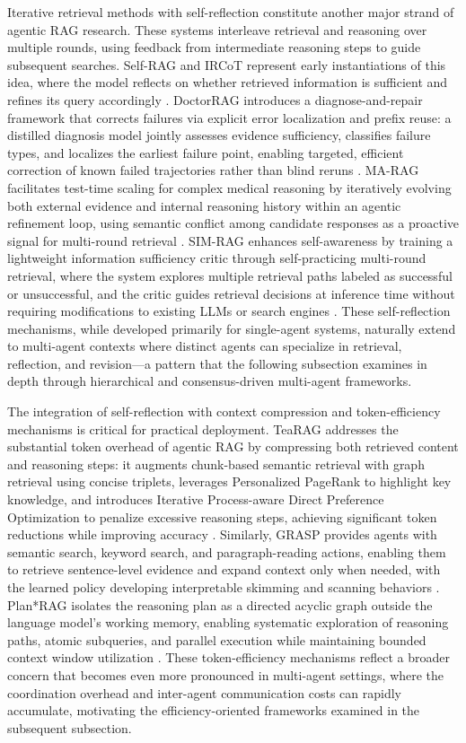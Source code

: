 \documentclass[11pt]{article}
\begin{document}
Iterative retrieval methods with self-reflection constitute another major strand of agentic RAG research. These systems interleave retrieval and reasoning over multiple rounds, using feedback from intermediate reasoning steps to guide subsequent searches. Self-RAG and IRCoT represent early instantiations of this idea, where the model reflects on whether retrieved information is sufficient and refines its query accordingly \cite{ref170}. DoctorRAG introduces a diagnose-and-repair framework that corrects failures via explicit error localization and prefix reuse: a distilled diagnosis model jointly assesses evidence sufficiency, classifies failure types, and localizes the earliest failure point, enabling targeted, efficient correction of known failed trajectories rather than blind reruns \cite{ref309}. MA-RAG facilitates test-time scaling for complex medical reasoning by iteratively evolving both external evidence and internal reasoning history within an agentic refinement loop, using semantic conflict among candidate responses as a proactive signal for multi-round retrieval \cite{ref310}. SIM-RAG enhances self-awareness by training a lightweight information sufficiency critic through self-practicing multi-round retrieval, where the system explores multiple retrieval paths labeled as successful or unsuccessful, and the critic guides retrieval decisions at inference time without requiring modifications to existing LLMs or search engines \cite{ref282}. These self-reflection mechanisms, while developed primarily for single-agent systems, naturally extend to multi-agent contexts where distinct agents can specialize in retrieval, reflection, and revision---a pattern that the following subsection examines in depth through hierarchical and consensus-driven multi-agent frameworks.

The integration of self-reflection with context compression and token-efficiency mechanisms is critical for practical deployment. TeaRAG addresses the substantial token overhead of agentic RAG by compressing both retrieved content and reasoning steps: it augments chunk-based semantic retrieval with graph retrieval using concise triplets, leverages Personalized PageRank to highlight key knowledge, and introduces Iterative Process-aware Direct Preference Optimization to penalize excessive reasoning steps, achieving significant token reductions while improving accuracy \cite{ref311}. Similarly, GRASP provides agents with semantic search, keyword search, and paragraph-reading actions, enabling them to retrieve sentence-level evidence and expand context only when needed, with the learned policy developing interpretable skimming and scanning behaviors \cite{ref312}. Plan*RAG isolates the reasoning plan as a directed acyclic graph outside the language model's working memory, enabling systematic exploration of reasoning paths, atomic subqueries, and parallel execution while maintaining bounded context window utilization \cite{ref313}. These token-efficiency mechanisms reflect a broader concern that becomes even more pronounced in multi-agent settings, where the coordination overhead and inter-agent communication costs can rapidly accumulate, motivating the efficiency-oriented frameworks examined in the subsequent subsection.
\end{document}
